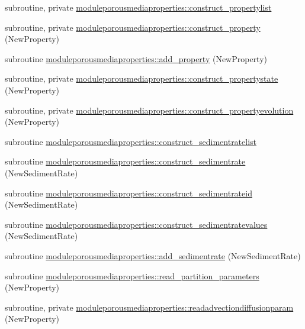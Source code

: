 \begin{DoxyCompactItemize}
\item 
subroutine, private \mbox{\hyperlink{namespacemoduleporousmediaproperties_a0b617f6e3c622010d4230970529e87fb}{moduleporousmediaproperties\+::construct\+\_\+propertylist}}
\item 
subroutine, private \mbox{\hyperlink{namespacemoduleporousmediaproperties_a3cb901c1fa6f5b569ff3841c39531ce5}{moduleporousmediaproperties\+::construct\+\_\+property}} (New\+Property)
\item 
subroutine \mbox{\hyperlink{namespacemoduleporousmediaproperties_a199bd8a8509f7ddd865f230c56680292}{moduleporousmediaproperties\+::add\+\_\+property}} (New\+Property)
\item 
subroutine, private \mbox{\hyperlink{namespacemoduleporousmediaproperties_a401ffa0cf421489bbc331e312e10ebd2}{moduleporousmediaproperties\+::construct\+\_\+propertystate}} (New\+Property)
\item 
subroutine, private \mbox{\hyperlink{namespacemoduleporousmediaproperties_a7475f0f419f35758071e5f74d001e408}{moduleporousmediaproperties\+::construct\+\_\+propertyevolution}} (New\+Property)
\item 
subroutine \mbox{\hyperlink{namespacemoduleporousmediaproperties_acc3491b7ab1e55b078caa370b4c75601}{moduleporousmediaproperties\+::construct\+\_\+sedimentratelist}}
\item 
subroutine \mbox{\hyperlink{namespacemoduleporousmediaproperties_abfc3b112a762e28d4f711dfe4a5d7d3d}{moduleporousmediaproperties\+::construct\+\_\+sedimentrate}} (New\+Sediment\+Rate)
\item 
subroutine \mbox{\hyperlink{namespacemoduleporousmediaproperties_a4bcf212cc66413ac54a86d6f71dab6d6}{moduleporousmediaproperties\+::construct\+\_\+sedimentrateid}} (New\+Sediment\+Rate)
\item 
subroutine \mbox{\hyperlink{namespacemoduleporousmediaproperties_a38a540abbf59777875ca535ba0683c59}{moduleporousmediaproperties\+::construct\+\_\+sedimentratevalues}} (New\+Sediment\+Rate)
\item 
subroutine \mbox{\hyperlink{namespacemoduleporousmediaproperties_a4a94ca075eedbc0f235c5c681470aee8}{moduleporousmediaproperties\+::add\+\_\+sedimentrate}} (New\+Sediment\+Rate)
\item 
subroutine \mbox{\hyperlink{namespacemoduleporousmediaproperties_a2b4f624f18ff4621d00ca5923d59cc36}{moduleporousmediaproperties\+::read\+\_\+partition\+\_\+parameters}} (New\+Property)
\item 
subroutine, private \mbox{\hyperlink{namespacemoduleporousmediaproperties_af16278987bb08e48f63b916cf573a68d}{moduleporousmediaproperties\+::readadvectiondiffusionparam}} (New\+Property)

\end{DoxyCompactItemize}
